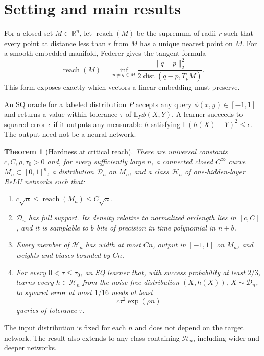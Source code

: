 \documentclass{article}
\newtheorem{theorem}{Theorem}
\theoremstyle{definition}
\theoremstyle{remark}
\newcommand{\R}{\mathbb R}
\newcommand{\cD}{\mathcal D}
\newcommand{\cH}{\mathcal H}
\newcommand{\1}{\mathbf 1}
\newcommand{\reach}{\operatorname{reach}}
\newcommand{\dist}{\operatorname{dist}}
\begin{document}
\section{Setting and main results}

For a closed set $M\subset\R^n$, let $\reach(M)$ be the supremum of radii $r$ such that every point at distance less than $r$ from $M$ has a unique nearest point on $M$. For a smooth embedded manifold, Federer gives the tangent formula
\begin{equation}
\reach(M)=\inf_{p\ne q\in M}
\frac{\|q-p\|_2^2}{2\dist(q-p,T_pM)}.
\label{eq:federer}
\end{equation}
This form exposes exactly which vectors a linear embedding must preserve.

An SQ oracle for a labeled distribution $P$ accepts any query $\phi(x,y)\in[-1,1]$ and returns a value within tolerance $\tau$ of $\mathbb E_P\phi(X,Y)$. A learner succeeds to squared error $\epsilon$ if it outputs any measurable $h$ satisfying $\mathbb E(h(X)-Y)^2\leq\epsilon$. The output need not be a neural network.

\begin{theorem}[Hardness at critical reach]
\label{thm:main}
There are universal constants $c,C,\rho,\tau_0>0$ and, for every sufficiently large $n$, a connected closed $C^\infty$ curve $M_n\subset[0,1]^n$, a distribution $\cD_n$ on $M_n$, and a class $\cH_n$ of one-hidden-layer ReLU networks such that:
\begin{enumerate}
\item $c\sqrt n\leq\reach(M_n)\leq C\sqrt n$.
\item $\cD_n$ has full support. Its density relative to normalized arclength lies in $[c,C]$, and it is samplable to $b$ bits of precision in time polynomial in $n+b$.
\item Every member of $\cH_n$ has width at most $Cn$, output in $[-1,1]$ on $M_n$, and weights and biases bounded by $Cn$.
\item For every $0<\tau\leq\tau_0$, an SQ learner that, with success probability at least $2/3$, learns every $h\in\cH_n$ from the noise-free distribution $(X,h(X))$, $X\sim\cD_n$, to squared error at most $1/16$ needs at least
\[ c\tau^2\exp(\rho n) \] queries of tolerance $\tau$.
\end{enumerate}
\end{theorem}

The input distribution is fixed for each $n$ and does not depend on the target network. The result also extends to any class containing $\cH_n$, including wider and deeper networks.
\end{document}
